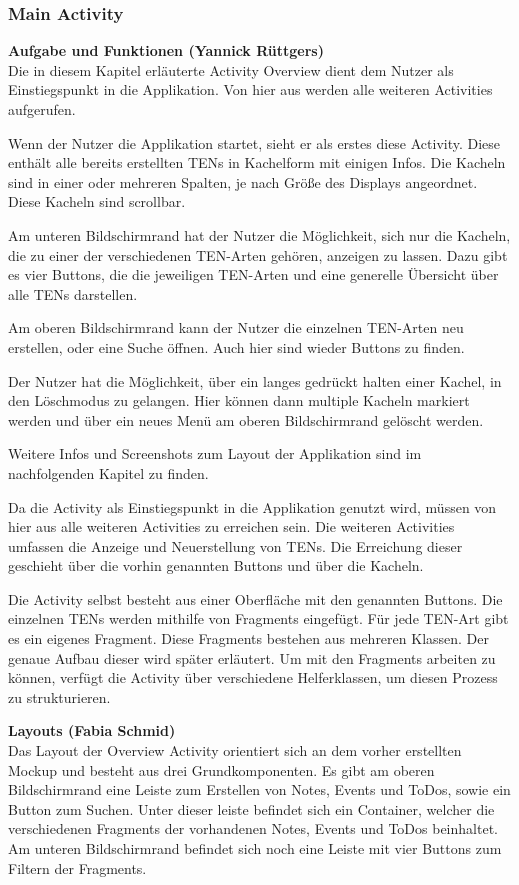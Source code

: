 \subsubsection{Main Activity}
\textbf{Aufgabe und Funktionen (Yannick Rüttgers)}\\
Die in diesem Kapitel erläuterte Activity Overview dient dem Nutzer als Einstiegspunkt in die Applikation. Von hier aus werden alle weiteren Activities aufgerufen.

Wenn der Nutzer die Applikation startet, sieht er als erstes diese Activity. Diese enthält alle bereits erstellten TENs in Kachelform mit einigen Infos. Die Kacheln sind in einer oder mehreren Spalten, je nach Größe des Displays angeordnet. Diese Kacheln sind scrollbar.

Am unteren Bildschirmrand hat der Nutzer die Möglichkeit, sich nur die Kacheln, die zu einer der verschiedenen TEN-Arten gehören, anzeigen zu lassen. Dazu gibt es vier Buttons, die die jeweiligen TEN-Arten und eine generelle Übersicht über alle TENs darstellen.

Am oberen Bildschirmrand kann der Nutzer die einzelnen TEN-Arten neu erstellen, oder eine Suche öffnen. Auch hier sind wieder Buttons zu finden.

Der Nutzer hat die Möglichkeit, über ein langes gedrückt halten einer Kachel, in den Löschmodus zu gelangen. Hier können dann multiple Kacheln markiert werden und über ein neues Menü am oberen Bildschirmrand gelöscht werden.

Weitere Infos und Screenshots zum Layout der Applikation sind im nachfolgenden Kapitel zu finden.

Da die Activity als Einstiegspunkt in die Applikation genutzt wird, müssen von hier aus alle weiteren Activities zu erreichen sein. Die weiteren Activities umfassen die Anzeige und Neuerstellung von TENs. Die Erreichung dieser geschieht über die vorhin genannten Buttons und über die Kacheln.

Die Activity selbst besteht aus einer Oberfläche mit den genannten Buttons. Die einzelnen TENs werden mithilfe von Fragments eingefügt. Für jede TEN-Art gibt es ein eigenes Fragment. Diese Fragments bestehen aus mehreren Klassen. Der genaue Aufbau dieser wird später erläutert. Um mit den Fragments arbeiten zu können, verfügt die Activity über verschiedene Helferklassen, um diesen Prozess zu strukturieren.


\textbf{Layouts (Fabia Schmid)}\\
Das Layout der Overview Activity orientiert sich an dem vorher erstellten Mockup und besteht aus drei Grundkomponenten. Es gibt am oberen Bildschirmrand eine Leiste zum Erstellen von Notes, Events und ToDos, sowie ein Button zum Suchen. Unter dieser leiste befindet sich ein Container, welcher die verschiedenen Fragments der vorhandenen Notes, Events und ToDos beinhaltet. Am unteren Bildschirmrand befindet sich noch eine Leiste mit vier Buttons zum Filtern der  Fragments.

